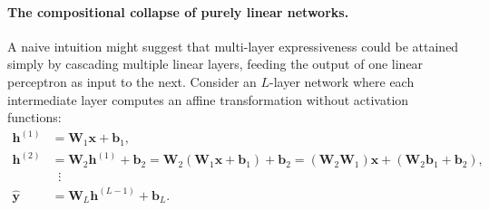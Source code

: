 \paragraph{The compositional collapse of purely linear networks.}
A naive intuition might suggest that multi-layer expressiveness could be attained simply by cascading multiple linear layers, feeding the output of one linear perceptron as input to the next. Consider an $L$-layer network where each intermediate layer computes an affine transformation without activation functions:
\begin{align}
\mathbf{h}^{(1)} &= \mathbf{W}_1 \mathbf{x} + \mathbf{b}_1, \nonumber \\
\mathbf{h}^{(2)} &= \mathbf{W}_2 \mathbf{h}^{(1)} + \mathbf{b}_2 = \mathbf{W}_2 (\mathbf{W}_1 \mathbf{x} + \mathbf{b}_1) + \mathbf{b}_2 = (\mathbf{W}_2 \mathbf{W}_1)\mathbf{x} + (\mathbf{W}_2 \mathbf{b}_1 + \mathbf{b}_2), \nonumber \\
&\;\;\vdots \nonumber \\
\hat{\mathbf{y}} &= \mathbf{W}_L \mathbf{h}^{(L-1)} + \mathbf{b}_L.
\label{eq:linear_network_cascade}
\end{align}

